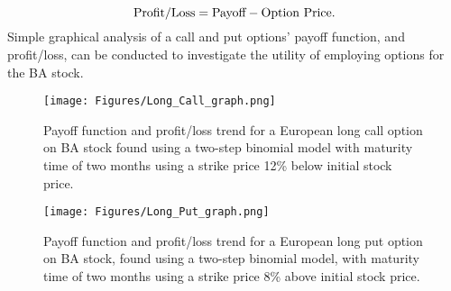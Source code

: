 \documentclass[
	a4paper, %
	11pt, %
	twoside, %
]{LTJournalArticle}
\begin{document}
\begin{equation}
	\textnormal{Profit/Loss} = \textnormal{Payoff} - \textnormal{Option Price}.
\end{equation}
Simple graphical analysis of a call and put options' payoff function, and profit/loss, can be conducted to investigate the utility of employing options for the BA stock.
\begin{figure}[ht]
	\texttt{[image: Figures/Long\_Call\_graph.png]}
	\caption{Payoff function and profit/loss trend for a European long call option on BA stock found using a two-step binomial model with maturity time of two months using a strike price 12\% below initial stock price.}
	\label{fig:Call}
\end{figure}
\begin{figure}[ht]
	\texttt{[image: Figures/Long\_Put\_graph.png]}
	\caption{Payoff function and profit/loss trend for a European long put option on BA stock, found using a two-step binomial model, with maturity time of two months using a strike price 8\% above initial stock price.}
	\label{fig:Put}
\end{figure}
\end{document}
